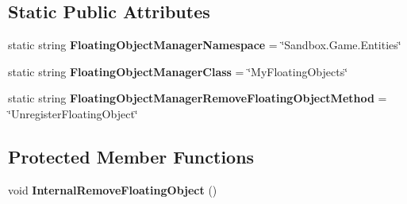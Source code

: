 \subsection*{Static Public Attributes}
\begin{DoxyCompactItemize}
\item 
\hypertarget{class_s_e_mod_a_p_i_internal_1_1_a_p_i_1_1_entity_1_1_sector_1_1_sector_object_1_1_floating_object_manager_af7fc2ae62504bd9bf6634dd5d1eb72c3}{}static string {\bfseries Floating\+Object\+Manager\+Namespace} = \char`\"{}Sandbox.\+Game.\+Entities\char`\"{}\label{class_s_e_mod_a_p_i_internal_1_1_a_p_i_1_1_entity_1_1_sector_1_1_sector_object_1_1_floating_object_manager_af7fc2ae62504bd9bf6634dd5d1eb72c3}

\item 
\hypertarget{class_s_e_mod_a_p_i_internal_1_1_a_p_i_1_1_entity_1_1_sector_1_1_sector_object_1_1_floating_object_manager_a3d15f9f774c612852111e9fd3431e0be}{}static string {\bfseries Floating\+Object\+Manager\+Class} = \char`\"{}My\+Floating\+Objects\char`\"{}\label{class_s_e_mod_a_p_i_internal_1_1_a_p_i_1_1_entity_1_1_sector_1_1_sector_object_1_1_floating_object_manager_a3d15f9f774c612852111e9fd3431e0be}

\item 
\hypertarget{class_s_e_mod_a_p_i_internal_1_1_a_p_i_1_1_entity_1_1_sector_1_1_sector_object_1_1_floating_object_manager_a421ab1a7517d2ff8093f9a2d85fc82e4}{}static string {\bfseries Floating\+Object\+Manager\+Remove\+Floating\+Object\+Method} = \char`\"{}Unregister\+Floating\+Object\char`\"{}\label{class_s_e_mod_a_p_i_internal_1_1_a_p_i_1_1_entity_1_1_sector_1_1_sector_object_1_1_floating_object_manager_a421ab1a7517d2ff8093f9a2d85fc82e4}

\end{DoxyCompactItemize}
\subsection*{Protected Member Functions}
\begin{DoxyCompactItemize}
\item 
\hypertarget{class_s_e_mod_a_p_i_internal_1_1_a_p_i_1_1_entity_1_1_sector_1_1_sector_object_1_1_floating_object_manager_a66960260c1366eaa5a0d16c438372370}{}void {\bfseries Internal\+Remove\+Floating\+Object} ()\label{class_s_e_mod_a_p_i_internal_1_1_a_p_i_1_1_entity_1_1_sector_1_1_sector_object_1_1_floating_object_manager_a66960260c1366eaa5a0d16c438372370}

\end{DoxyCompactItemize}
